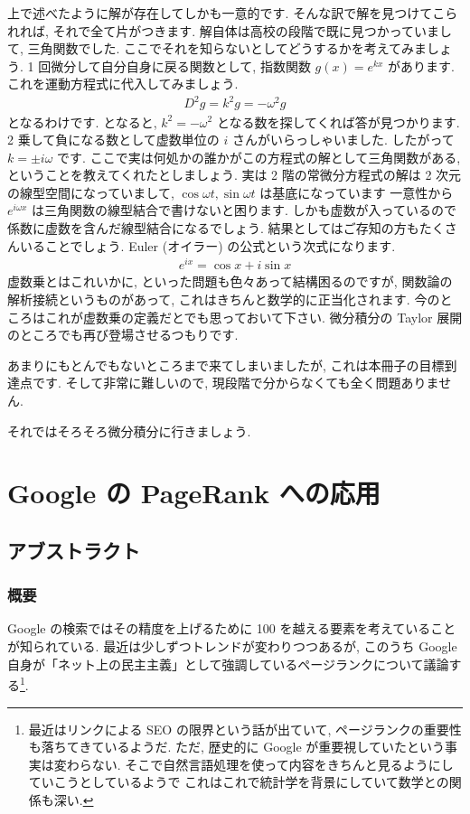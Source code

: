 \documentclass[openany, a4paper, oneside]{jsbook}
\theoremstyle{break}
\theoremstyle{breakdefn}
\begin{document}
上で述べたように解が存在してしかも一意的です. そんな訳で解を見つけてこられれば, それで全て片がつきます.
解自体は高校の段階で既に見つかっていまして, 三角関数でした. ここでそれを知らないとしてどうするかを考えてみましょう.
1 回微分して自分自身に戻る関数として, 指数関数 $g (x)=e^{kx}$ があります. これを運動方程式に代入してみましょう.
    \begin{align}
        D^2 g = k^2 g = - \omega ^{2} g
    \end{align}
となるわけです. となると,  $k^2=-\omega^2$ となる数を探してくれば答が見つかります.
2 乗して負になる数として虚数単位の $i$ さんがいらっしゃいました. したがって $k=\pm i\omega$ です.
ここで実は何処かの誰かがこの方程式の解として三角関数がある, ということを教えてくれたとしましょう.
実は 2 階の常微分方程式の解は 2 次元の線型空間になっていまして,  $\cos \omega t,\sin \omega t$ は基底になっています
一意性から $e^{i\omega x}$ は三角関数の線型結合で書けないと困ります. しかも虚数が入っているので
係数に虚数を含んだ線型結合になるでしょう. 結果としてはご存知の方もたくさんいることでしょう.
Euler (オイラー) の公式という次式になります.
    \begin{align}
        e^{ix} = \cos x + i \sin x
    \end{align}
虚数乗とはこれいかに, といった問題も色々あって結構困るのですが,
関数論の解析接続というものがあって, これはきちんと数学的に正当化されます.
今のところはこれが虚数乗の定義だとでも思っておいて下さい.
微分積分の Taylor 展開のところでも再び登場させるつもりです.

あまりにもとんでもないところまで来てしまいましたが, これは本冊子の目標到達点です.
そして非常に難しいので, 現段階で分からなくても全く問題ありません.

それではそろそろ微分積分に行きましょう.
\chapter{Google の PageRank への応用}

\section{アブストラクト}

\subsection{概要}


Google の検索ではその精度を上げるために
100 を越える要素を考えていることが知られている.
最近は少しずつトレンドが変わりつつあるが,
このうち Google 自身が「ネット上の民主主義」として強調しているページランクについて議論する\footnote{最近はリンクによる SEO の限界という話が出ていて,
ページランクの重要性も落ちてきているようだ.
ただ, 歴史的に Google が重要視していたという事実は変わらない.
そこで自然言語処理を使って内容をきちんと見るようにしていこうとしているようで
これはこれで統計学を背景にしていて数学との関係も深い.
 }.
\end{document}
